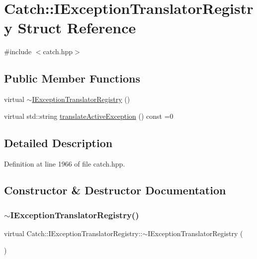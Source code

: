 \hypertarget{struct_catch_1_1_i_exception_translator_registry}{}\section{Catch\+:\+:I\+Exception\+Translator\+Registry Struct Reference}
\label{struct_catch_1_1_i_exception_translator_registry}


{\ttfamily \#include $<$catch.\+hpp$>$}

\subsection*{Public Member Functions}
\begin{DoxyCompactItemize}
\item 
virtual \mbox{\hyperlink{struct_catch_1_1_i_exception_translator_registry_acf7402e18789ea46d54ea8564ac358d3}{$\sim$\+I\+Exception\+Translator\+Registry}} ()
\item 
virtual std\+::string \mbox{\hyperlink{struct_catch_1_1_i_exception_translator_registry_af76ae8c331a17f2a94c9720bc0d686bb}{translate\+Active\+Exception}} () const =0
\end{DoxyCompactItemize}


\subsection{Detailed Description}


Definition at line 1966 of file catch.\+hpp.



\subsection{Constructor \& Destructor Documentation}
\mbox{\label{struct_catch_1_1_i_exception_translator_registry_acf7402e18789ea46d54ea8564ac358d3}} 
\subsubsection{\texorpdfstring{$\sim$\+I\+Exception\+Translator\+Registry()}{~IExceptionTranslatorRegistry()}}
{\footnotesize\ttfamily virtual Catch\+::\+I\+Exception\+Translator\+Registry\+::$\sim$\+I\+Exception\+Translator\+Registry (\begin{DoxyParamCaption}{ }\end{DoxyParamCaption})\hspace{0.3cm}{\ttfamily [virtual]}}



